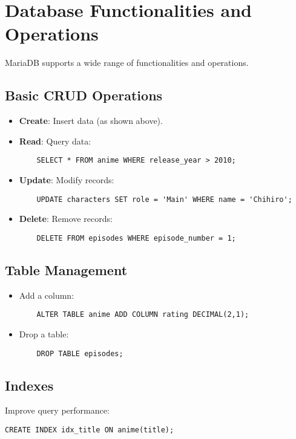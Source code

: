 \documentclass[10pt]{article}
\begin{document}
\section{Database Functionalities and Operations}
MariaDB supports a wide range of functionalities and operations.

\subsection{Basic CRUD Operations}
\begin{itemize}
    \item \textbf{Create}: Insert data (as shown above).
    \item \textbf{Read}: Query data:
    \begin{verbatim}
    SELECT * FROM anime WHERE release_year > 2010;
    \end{verbatim}
    \item \textbf{Update}: Modify records:
    \begin{verbatim}
    UPDATE characters SET role = 'Main' WHERE name = 'Chihiro';
    \end{verbatim}
    \item \textbf{Delete}: Remove records:
    \begin{verbatim}
    DELETE FROM episodes WHERE episode_number = 1;
    \end{verbatim}
\end{itemize}

\subsection{Table Management}
\begin{itemize}
    \item Add a column:
    \begin{verbatim}
    ALTER TABLE anime ADD COLUMN rating DECIMAL(2,1);
    \end{verbatim}
    \item Drop a table:
    \begin{verbatim}
    DROP TABLE episodes;
    \end{verbatim}
\end{itemize}

\subsection{Indexes}
Improve query performance:
\begin{verbatim}
CREATE INDEX idx_title ON anime(title);
\end{verbatim}
\end{document}
